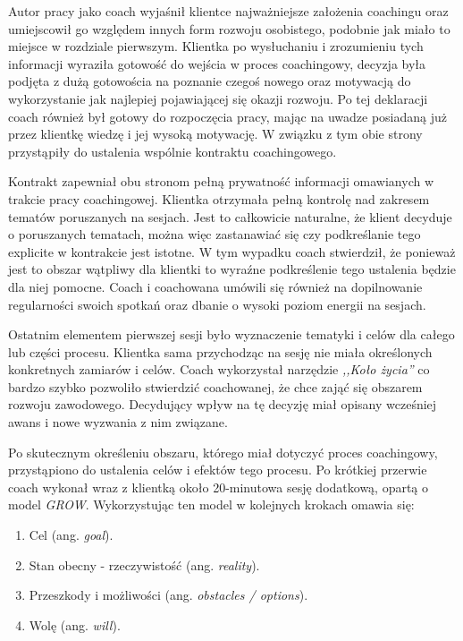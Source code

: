 Autor pracy jako coach wyjaśnił klientce najważniejsze założenia coachingu oraz umiejscowił go względem innych form rozwoju osobistego, podobnie jak miało to miejsce
w rozdziale pierwszym. Klientka po wysłuchaniu i zrozumieniu tych informacji wyraziła gotowość do wejścia w proces coachingowy, decyzja była podjęta
z dużą gotowościa na poznanie czegoś nowego oraz motywacją do wykorzystanie jak najlepiej pojawiającej się okazji rozwoju. Po tej deklaracji coach również
był gotowy do rozpoczęcia pracy, mając na uwadze posiadaną już przez klientkę wiedzę i jej wysoką motywację. W związku z tym obie strony przystąpiły
do ustalenia wspólnie kontraktu coachingowego.

Kontrakt zapewniał obu stronom pełną prywatność informacji omawianych w trakcie pracy coachingowej. Klientka otrzymała pełną kontrolę nad zakresem tematów
poruszanych na sesjach. Jest to całkowicie naturalne, że klient decyduje o poruszanych tematach, można więc zastanawiać się czy podkreślanie tego explicite
w kontrakcie jest istotne. W tym wypadku coach stwierdził, że ponieważ jest to obszar wątpliwy dla klientki to wyraźne podkreślenie tego ustalenia
będzie dla niej pomocne. Coach i coachowana umówili się również na dopilnowanie regularności swoich spotkań oraz dbanie o wysoki poziom energii na sesjach.

Ostatnim elementem pierwszej sesji było wyznaczenie tematyki i celów dla całego lub części procesu. Klientka sama przychodząc na sesję nie miała określonych
konkretnych zamiarów i celów. Coach wykorzystał narzędzie \emph{,,Koło życia''} co bardzo szybko pozwoliło stwierdzić coachowanej, że chce zająć się obszarem
rozwoju zawodowego. Decydujący wpływ na tę decyzję miał opisany wcześniej awans i nowe wyzwania z nim związane.

Po skutecznym określeniu obszaru, którego miał dotyczyć proces coachingowy, przystąpiono do ustalenia celów i efektów tego procesu. Po krótkiej przerwie
coach wykonał wraz z klientką około 20-minutowa sesję dodatkową, opartą o model \emph{GROW}. Wykorzystując ten model w kolejnych krokach omawia się:
\begin{enumerate}
  \item Cel (ang. \emph{goal}).
  \item Stan obecny - rzeczywistość (ang. \emph{reality}).
  \item Przeszkody i możliwości (ang. \emph{obstacles / options}).
  \item Wolę (ang. \emph{will}).
\end{enumerate}

